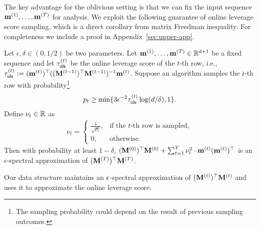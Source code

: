 The key advantage for the oblivious setting is that we can fix the input sequence $\mathbf{m}^{(1)}, \ldots, \mathbf{m}^{(T)}$ for analysis. We exploit the following guarantee of online leverage score sampling, which is a direct corollary from matrix Freedman inequality. For completeness we include a proof in Appendix~\ref{sec:upper-app}.
\begin{lemma}\label{lem:spectral-online-leverage-score}
Let $\epsilon, \delta \in (0,1/2)$ be two parameters. Let $\mathbf{m}^{(1)}, \ldots, \mathbf{m}^{(T)} \in \mathbb{R}^{d+1}$ be a fixed sequence and let $\tau_{\mathsf{ols}}^{(t)}$ be the online leverage score of the $t$-th row, i.e., $\tau_{\mathsf{ols}}^{(t)}:= (\mathbf{m}^{(t)})^\top ((\mathbf{M}^{(t-1)})^\top\mathbf{M}^{(t-1)})^{-1}\mathbf{m}^{(t)}$. 
Suppose an algorithm samples the $t$-th row with probability\footnote{The sampling probability could depend on the result of previous sampling outcomes.}
\begin{align*}
p_t \geq \min\{3 \epsilon^{-2} \tau_{\mathsf{ols}}^{(t)} \log(d / \delta), 1\}.
\end{align*}
Define $\nu_t \in \mathbb{R}$ as
\begin{align*}
    \nu_t = 
    \begin{cases}
    \frac{1}{\sqrt{p_t}}, & \text{if the } t\text{-th row is sampled},  \\
    0, & \text{otherwise.}
    \end{cases}
\end{align*}
Then with probability at least $1 - \delta$, $(\mathbf{M}^{(0)})^\top \mathbf{M}^{(0)} + \sum_{t=1}^{T}\nu_t^2\cdot \mathbf{m}^{(t)} (\mathbf{m}^{(t)})^\top$ is an $\epsilon$-spectral approximation of $(\mathbf{M}^{(T)})^\top \mathbf{M}^{(T)}$.
\end{lemma}


Our data structure maintains an $\epsilon$-spectral approximation of $(\mathbf{M}^{(t)})^\top \mathbf{M}^{(t)}$ and uses it to approximate the online leverage score.

